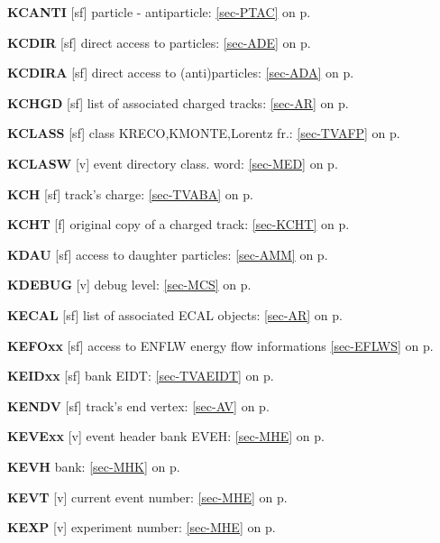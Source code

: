  \item{\bf KCANTI  }[sf] particle - antiparticle: \ref{sec-PTAC} on p.~\pageref{sec-PTAC}\\
 \item{\bf KCDIR   }[sf] direct access to particles: \ref{sec-ADE} on p.~\pageref{sec-ADE}\\
 \item{\bf KCDIRA  }[sf] direct access to (anti)particles: \ref{sec-ADA} on p.~\pageref{sec-ADA}\\
 \item{\bf KCHGD   }[sf] list of associated charged tracks: \ref{sec-AR} on p.~\pageref{sec-AR}\\
 \item{\bf KCLASS  }[sf] class KRECO,KMONTE,Lorentz fr.: \ref{sec-TVAFP} on p.~\pageref{sec-TVAFP}\\
 \item{\bf KCLASW  }[v] event directory class. word: \ref{sec-MED} on p.~\pageref{sec-MED}\\
 \item{\bf KCH     }[sf] track's charge: \ref{sec-TVABA} on p.~\pageref{sec-TVABA}\\
 \item{\bf KCHT    }[f] original copy of a charged track: \ref{sec-KCHT} on p.~\pageref{sec-KCHT}\\
 \item{\bf KDAU    }[sf] access to daughter particles: \ref{sec-AMM} on p.~\pageref{sec-AMM}\\
 \item{\bf KDEBUG  }[v] debug level: \ref{sec-MCS} on p.~\pageref{sec-MCS}\\
 \item{\bf KECAL   }[sf] list of associated ECAL objects: \ref{sec-AR} on p.~\pageref{sec-AR}\\
 \item{\bf KEFOxx  }[sf] access to ENFLW energy flow informations
                    \ref{sec-EFLWS} on p.~\pageref{sec-EFLWS}\\
 \item{\bf KEIDxx  }[sf] bank EIDT: \ref{sec-TVAEIDT} on p.~\pageref{sec-TVAEIDT}\\
 \item{\bf KENDV   }[sf] track's end vertex: \ref{sec-AV} on p.~\pageref{sec-AV}\\
 \item{\bf KEVExx  }[v] event header bank EVEH: \ref{sec-MHE} on p.~\pageref{sec-MHE}\\
 \item{\bf KEVH    }bank: \ref{sec-MHK} on p.~\pageref{sec-MHK}\\
 \item{\bf KEVT    }[v] current event number: \ref{sec-MHE} on p.~\pageref{sec-MHE}\\
 \item{\bf KEXP    }[v] experiment number: \ref{sec-MHE} on p.~\pageref{sec-MHE}
 
